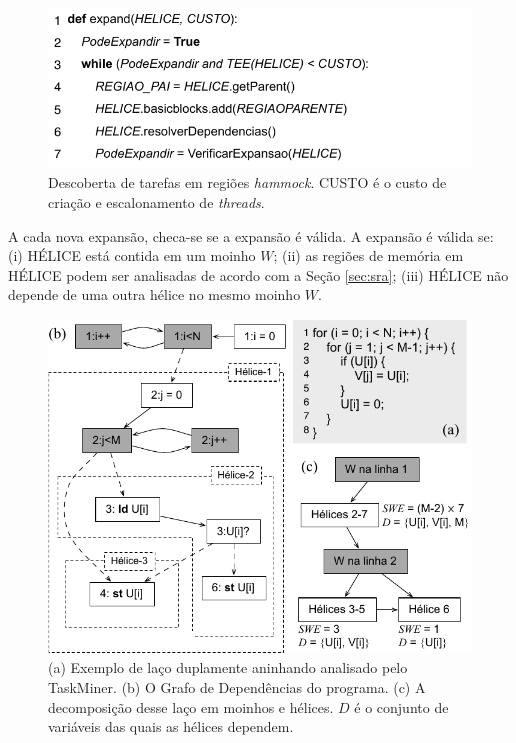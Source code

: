 \documentclass[sigconf]{acmart}
\newcommand\Taskminer{\mbox{\textsf{TaskMiner}}}
\begin{document}
\begin{figure}[h]
\begin{center}
\includegraphics[width=1\columnwidth]{images/expand_alg}
\caption{Descoberta de tarefas em regiões {\em hammock}.
\textsf{CUSTO} é o custo de criação e escalonamento de {\em threads}.}
\label{fig:expand_alg}
\end{center}
\end{figure}

A cada nova expansão, checa-se se a expansão é válida. A expansão é válida se:
(i) \textsf{HÉLICE} está contida em um moinho $W$;
(ii) as regiões de memória em \textsf{HÉLICE} podem ser analisadas de acordo com
a Seção \ref{sec:sra};
(iii) \textsf{HÉLICE} não depende de uma outra hélice no mesmo moinho $W$.

\begin{figure}[h]
\begin{center}
\includegraphics[width=1\columnwidth]{images/ex_expansion}
\caption{(a) Exemplo de laço duplamente aninhando analisado pelo {\Taskminer}.
(b) O Grafo de Dependências do programa.
(c) A decomposição desse laço em moinhos e hélices. $D$ é o conjunto de variáveis
das quais as hélices dependem.}
\label{fig:ex_expansion}
\end{center}
\end{figure}
\end{document}
